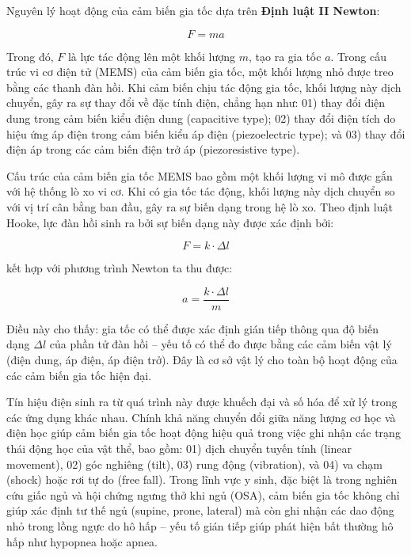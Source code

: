 Nguyên lý hoạt động của cảm biến gia tốc dựa trên \textbf{Định luật II Newton}:

\begin{equation}
  F = ma
\end{equation}

Trong đó, $F$ là lực tác động lên một khối lượng $m$, tạo ra gia tốc $a$. Trong
cấu trúc vi cơ điện tử (MEMS) của cảm biến gia tốc, một khối lượng nhỏ được
treo bằng các thanh đàn hồi. Khi cảm biến chịu tác động gia tốc, khối lượng này
dịch chuyển, gây ra sự thay đổi về đặc tính điện, chẳng hạn như: 01) thay đổi
điện dung trong cảm biến kiểu điện dung (capacitive type); 02) thay đổi điện
tích do hiệu ứng áp điện trong cảm biến kiểu áp điện (piezoelectric type); và
03) thay đổi điện áp trong các cảm biến điện trở áp (piezoresistive type).

Cấu trúc của cảm biến gia tốc MEMS bao gồm một khối lượng vi mô được gắn với hệ
thống lò xo vi cơ. Khi có gia tốc tác động, khối lượng này dịch chuyển so với
vị trí cân bằng ban đầu, gây ra sự biến dạng trong hệ lò xo. Theo định luật
Hooke, lực đàn hồi sinh ra bởi sự biến dạng này được xác định bởi:

\begin{equation}
  F = k \cdot \Delta l
\end{equation}

kết hợp với phương trình Newton ta thu được:

\begin{equation}
  a = \frac{k \cdot \Delta l}{m}
\end{equation}

Điều này cho thấy: gia tốc có thể được xác định gián tiếp thông qua
độ biến dạng $\Delta l$ của phần tử đàn hồi – yếu tố có thể đo được
bằng các cảm biến vật lý (điện dung, áp điện, áp điện trở).
Đây là cơ sở vật lý cho toàn bộ hoạt động của các cảm biến gia
tốc hiện đại.

Tín hiệu điện sinh ra từ quá trình này được khuếch đại và số hóa để xử lý trong
các ứng dụng khác nhau. Chính khả năng chuyển đổi giữa năng lượng cơ học và
điện học giúp cảm biến gia tốc hoạt động hiệu quả trong việc ghi nhận các trạng
thái động học của vật thể, bao gồm: 01) dịch chuyển tuyến tính (linear
movement), 02) góc nghiêng (tilt), 03) rung động (vibration), và 04) va chạm
(shock) hoặc rơi tự do (free fall). Trong lĩnh vực y sinh, đặc biệt là trong
nghiên cứu giấc ngủ và hội chứng ngưng thở khi ngủ (OSA), cảm biến gia tốc
không chỉ giúp xác định tư thế ngủ (supine, prone, lateral) mà còn ghi nhận các
dao động nhỏ trong lồng ngực do hô hấp – yếu tố gián tiếp giúp phát hiện bất
thường hô hấp như hypopnea hoặc apnea.

